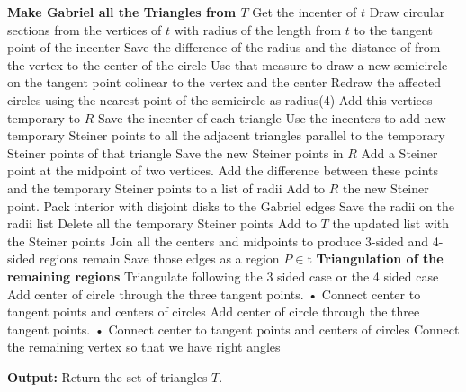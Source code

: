 \documentclass{article}
\begin{document}
\begin{algorithm}
\begin{algorithmic}[1]
\State \textbf{Make Gabriel all the Triangles from $T$}
            \State Get the incenter of $t$
            \State  Draw circular sections from the vertices of $t$ with radius of the length from $t$ to the tangent point of the incenter
                \State Save the difference of the radius and the distance of from the vertex to the center of the circle
                \State Use that measure to draw a new semicircle on the tangent point colinear to the vertex and the center
                \State Redraw the affected circles using the nearest point of the semicircle as radius(4) 
            \EndFor
            \State Add this vertices temporary to $R$ 
            \State Save the incenter of each triangle
        \EndIf
        \EndFor
{}
    Use the incenters to add new temporary Steiner points to all the adjacent triangles parallel to the temporary Steiner points of that triangle
    Save the new Steiner points in $R$
\EndFor
{}
    \State Add a Steiner point at the midpoint of two vertices.
    \State Add the difference between these points and the temporary Steiner points to a list of radii 
    \State Add to $R$ the new Steiner point.
    \State Pack interior with disjoint disks to the Gabriel edges 
    \State Save the radii on the radii list
    \State Delete all the temporary Steiner points
    \State Add to $T$ the updated list with the Steiner points
    \State Join all the centers and midpoints to produce 3-sided and 4-sided regions remain
    \State Save those edges as a region $P \in $t
\EndFor
\State \textbf{Triangulation of the remaining regions}
      \State Triangulate following the 3 sided case or the 4 sided case  
        \State Add center of circle through the three tangent points.
•       \State Connect center to tangent points and centers of circles
      \EndIf
        \State Add center of circle through the three tangent points.
•       \State Connect center to tangent points and centers of circles
        \State Connect the remaining vertex so that we have right angles
      \EndIf
\EndFor
\EndFor
 
 
\State \textbf{Output:} Return the set of triangles $T$.
 
\end{algorithmic}
\end{algorithm}
 
\end{document}
